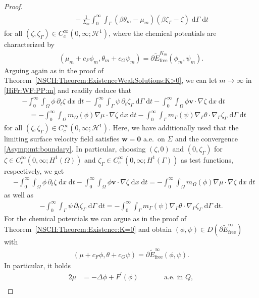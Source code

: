 \documentclass[11pt,reqno]{amsart}
\theoremstyle{remark}
\numberwithin{equation}{section}
\newcommand{\intO}{\int_\Omega}
\newcommand{\intG}{\int_\Gamma}
\newcommand{\dxt}{\;\mathrm{d}x\;\mathrm{d}t}
\newcommand{\dGt}{\;\mathrm{d}\Ga\;\mathrm{d}t}
\newcommand{\delt}{\partial_{t}}
\newcommand{\Grad}{\nabla}
\newcommand{\Lap}{\Delta}
\newcommand{\Gradg}{\nabla_\Ga}
\newcommand{\Om}{\Omega}
\newcommand{\Ga}{\Gamma}
\newcommand{\bv}{\mathbf v}
\newcommand{\bw}{\mathbf w}
\newcommand{\free}{\mathrm{free}}
\begin{document}
\begin{proof}
\begin{align}
\begin{split}
    &\qquad - \frac{1}{L_m}\int_0^\infty\intG (\beta\theta_m-\mu_m)(\beta\zeta_\Ga-\zeta)\dGt
    \end{split}
\end{align}
for all $(\zeta,\zeta_\Ga)\in C_c^\infty(0,\infty;\mathcal{H}^1)$, where the chemical potentials are characterized by
\begin{align}\label{HF:MT:M:SUBDIFF}
    (\mu_m+c_F\phi_m,\theta_m+c_G\psi_m) = \partial\widetilde E_\free^{K_m}(\phi_m,\psi_m).
\end{align}
Arguing again as in the proof of Theorem~\ref{NSCH:Theorem:ExistenceWeakSolutions:K>0}, we can let $m\rightarrow\infty$ in \eqref{HiFr:WF:PP:m} and readily deduce that
\begin{align*}
    &-\int_0^\infty\intO \phi\,\delt\zeta\dxt -\int_0^\infty\intG \psi\,\delt\zeta_\Ga\dGt - \int_0^\infty\intO\phi\bv\cdot\Grad\zeta\dxt \\
    &\quad = -\int_0^\infty\intO m_\Om(\phi)\Grad\mu\cdot\Grad\zeta\dxt - \int_0^\infty\intG m_\Ga(\psi)\Gradg\theta\cdot\Gradg\zeta_\Ga\dGt 
\end{align*}
for all $(\zeta,\zeta_\Ga)\in C_c^\infty(0,\infty;\mathcal{H}^1)$. Here, we have additionally used that the limiting surface velocity field satisfies $\bw = \mathbf 0$ a.e.~on $\Sigma$ and the convergence \eqref{Asymp:mt:boundary}. In particular, choosing $(\zeta,0)$ and $(0,\zeta_\Ga)$ for $\zeta\in C_c^\infty(0,\infty;H^1(\Om))$ and $\zeta_\Ga\in C_c^\infty(0,\infty;H^1(\Ga))$ as test functions, respectively, we get
\begin{align*}
    &-\int_0^\infty\intO \phi\,\delt\zeta\dxt  - \int_0^\infty\intO\phi\bv\cdot\Grad\zeta\dxt = -\int_0^\infty\intO m_\Om(\phi)\Grad\mu\cdot\Grad\zeta\dxt
\end{align*}
as well as
\begin{align*}
    -\int_0^\infty\intG \psi\,\delt\zeta_\Ga\dGt = - \int_0^\infty\intG m_\Ga(\psi)\Gradg\theta\cdot\Gradg\zeta_\Ga\dGt.
\end{align*}
For the chemical potentials we can argue as in the proof of Theorem~\ref{NSCH:Theorem:Existence:K=0} and obtain $(\phi,\psi)\in D(\partial\widetilde E_\free^\infty)$ with
\begin{align*}
    (\mu + c_F\phi,\theta + c_G\psi) = \partial \widetilde E_\free^\infty(\phi,\psi).
\end{align*}
In particular, it holds
\begin{alignat*}{2}
    \mu &= -\Lap\phi + F^\prime(\phi) &&\qquad\text{a.e.~in~}Q, \\

\end{alignat*}
\end{proof}
\end{document}

